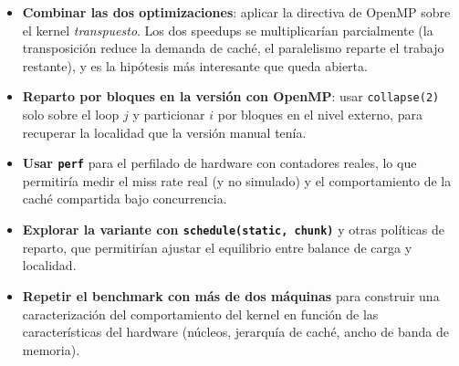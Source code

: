 \begin{itemize}
    \item \textbf{Combinar las dos optimizaciones}: aplicar la directiva de OpenMP sobre el kernel \emph{transpuesto}. Los dos speedups se multiplicarían parcialmente (la transposición reduce la demanda de caché, el paralelismo reparte el trabajo restante), y es la hipótesis más interesante que queda abierta.
    \item \textbf{Reparto por bloques en la versión con OpenMP}: usar \texttt{collapse(2)} solo sobre el loop $j$ y particionar $i$ por bloques en el nivel externo, para recuperar la localidad que la versión manual tenía.
    \item \textbf{Usar \texttt{perf}} para el perfilado de hardware con contadores reales, lo que permitiría medir el miss rate real (y no simulado) y el comportamiento de la caché compartida bajo concurrencia.
    \item \textbf{Explorar la variante con \texttt{schedule(static, chunk)}} y otras políticas de reparto, que permitirían ajustar el equilibrio entre balance de carga y localidad.
    \item \textbf{Repetir el benchmark con más de dos máquinas} para construir una caracterización del comportamiento del kernel en función de las características del hardware (núcleos, jerarquía de caché, ancho de banda de memoria).
\end{itemize}
